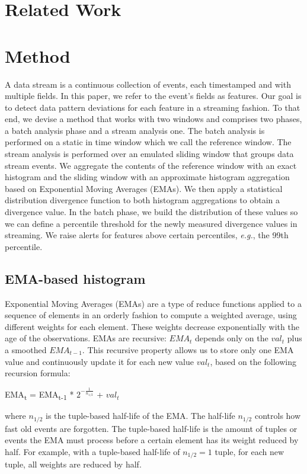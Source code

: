 \documentclass[sigconf]{acmart}
\begin{document}
\section{Related Work}
\label{sec:RelatedWork}


\section{Method}
\label{sec:Method}
A data stream is a continuous collection of events, each timestamped and with multiple fields. In this paper, we refer to the event's fields as features. Our goal is to detect data pattern deviations for each feature in a streaming fashion. To that end, we devise a method that works with two windows and comprises two phases, a batch analysis phase and a stream analysis one. The batch analysis is performed on a static in time window which we call the reference window. The stream analysis is performed over an emulated sliding window that groups data stream events. We aggregate the contents of the reference window with an exact histogram and the sliding window with an approximate histogram aggregation based on Exponential Moving Averages (EMAs). We then apply a statistical distribution divergence function to both histogram aggregations to obtain a divergence value. In the batch phase, we build the distribution of these values so we can define a percentile threshold for the newly measured divergence values in streaming. We raise alerts for features above certain percentiles, \textit{e.g.}, the 99th percentile.

\subsection{EMA-based histogram} \label{sec:ema-hist}
Exponential Moving Averages (EMAs) \cite{EMA-Everett2011, EMA-Hunter, EMA-MarcusB} are a type of reduce functions applied to a sequence of elements in an orderly fashion to compute a weighted average, using different weights for each element. These weights decrease exponentially with the age of the observations. EMAs are recursive: $EMA_t$ depends only on the $val_t$ plus a smoothed $EMA_{t-1}$. This recursive property allows us to store only one EMA value and continuously update it for each new value $val_t$, based on the following recursion formula:
\begin{definition}
EMA\textsubscript{t} = EMA\textsubscript{t-1} * $2^{-\frac{1}{n_{1/2}}}$ + $val_t$
\label{def:tuple-ema}
\end{definition} where $n_{1/2}$ is the tuple-based half-life of the EMA. 
The half-life $n_{1/2}$ controls how fast old events are forgotten. The tuple-based half-life is the amount of tuples or events the EMA must process before a certain element has its weight reduced by half. For example, with a tuple-based half-life of $n_{1/2}=1$ tuple, for each new tuple, all weights are reduced by half. 
\end{document}
